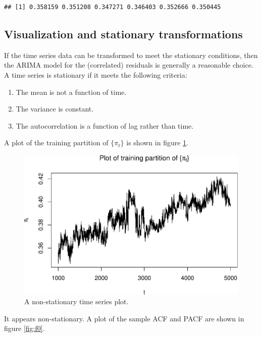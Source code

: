 \documentclass[final,
  11pt,
]{article}
\begin{document}
\begin{verbatim}
## [1] 0.358159 0.351208 0.347271 0.346403 0.352666 0.350445
\end{verbatim}

\hypertarget{visualization-and-stationary-transformations}{%
\subsection{Visualization and stationary
transformations}\label{visualization-and-stationary-transformations}}

If the time series data can be transformed to meet the stationary
conditions, then the ARIMA model for the (correlated) residuals is
generally a reasonable choice. A time series is stationary if it meets
the following criteria:
\begin{enumerate}
\item The mean is not a function of time.
\item The variance is constant.
\item The autocorrelation is a function of lag rather than time.
\end{enumerate}

A plot of the training partition of \(\{\pi_t\}\) is shown in
figure \ref{fig:fa}.

\begin{figure}
\includegraphics{paper_files/figure-latex/unnamed-chunk-2-1.pdf}
\caption{A non-stationary time series plot.}
\label{fig:fa}
\end{figure}

It appears non-stationary.
A plot of the sample ACF and PACF are shown in figure \ref{fig:f0}.
\end{document}
